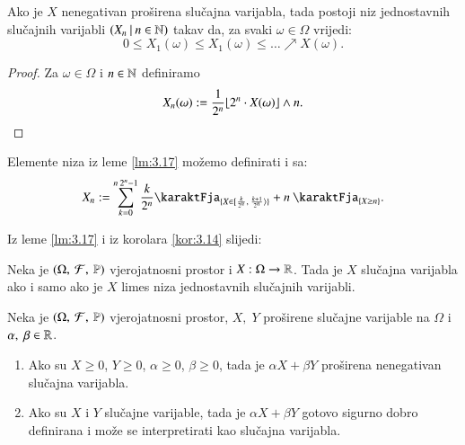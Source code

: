 \begin{lm}  \label{lm:3.17}
    Ako je $X$ nenegativan pro\v sirena slu\v cajna varijabla, tada postoji niz jednostavnih slu\v cajnih varijabli $({X_n} \: | \: {n \in \mathbb{N}})$ takav da, za svaki $\omega \in \Omega$ vrijedi:
    \begin{equation*}
        0 \leq X_1(\omega) \leq X_1(\omega) \leq  \dots \nearrow X(\omega).
    \end{equation*} 
\end{lm}

\begin{proof}
    Za $\omega \in \Omega$ i $n \in \mathbb{N}$ definiramo
    \begin{equation*}
        X_n(\omega) := \frac{1}{2^n} \floor*{2^n \cdot X(\omega)} \land n.
    \end{equation*}
\end{proof}

\begin{nap} \label{nap:3.17-1}
    Elemente niza iz leme \ref{lm:3.17} mo\v zemo definirati i sa:
    \begin{equation*}
        X_n := \suma{k = 0}{n \: 2^n - 1} \frac{k}{2^n} \karaktFja_{\{ X \in \desInt{\frac{k}{2^n}}{\frac{k + 1}{2^n}} \}} + n \: \karaktFja_{\{X \geq n\}}.
    \end{equation*}
\end{nap}

Iz leme \ref{lm:3.17} i iz korolara \ref{kor:3.14} slijedi:

\begin{tm}  \label{tm:3.18}
    Neka je $(\Omega, \: \mathcal{F}, \: \mathbb{P})$ vjerojatnosni prostor i $X: \Omega \to \mathbb{R}$. Tada je $X$ slu\v cajna varijabla ako i samo ako je $X$ limes niza jednostavnih slu\v cajnih varijabli.
\end{tm}

\begin{zad} \label{zad:3.19}
    Neka je $(\Omega, \: \mathcal{F}, \: \mathbb{P})$ vjerojatnosni prostor, $X, \; Y$ pro\v sirene slu\v cajne varijable na $\Omega$ i $\alpha, \; \beta \in \mathbb{R}$.
    \begin{enumerate}[label=(\alph*)]
        \item Ako su $X \geq 0$, $Y \geq 0$, $\alpha \geq 0$, $\beta    \geq 0$, tada je $\alpha X + \beta Y$ pro\v sirena nenegativan slu\v cajna varijabla.
        \item Ako su $X$ i $Y$ slu\v cajne  varijable, tada je $\alpha X + \beta Y$ gotovo sigurno dobro definirana i mo\v ze se interpretirati kao slu\v cajna varijabla.
    \end{enumerate}
\end{zad}

